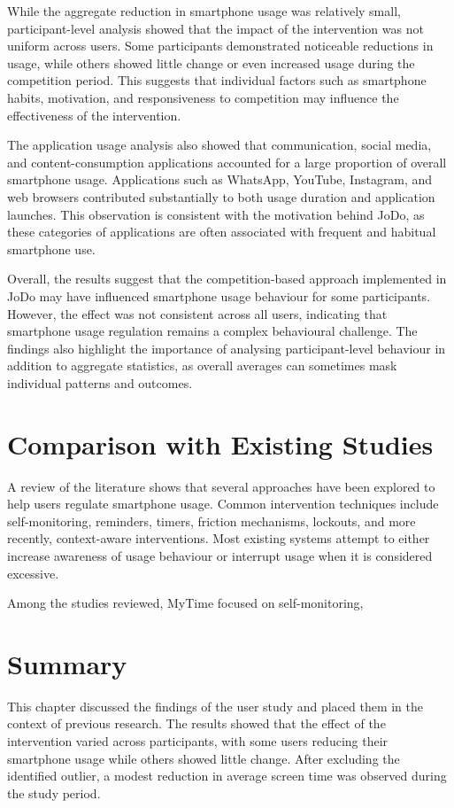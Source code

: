 \documentclass[11pt]{report}
\begin{document}
While the aggregate reduction in smartphone usage was relatively small, participant-level 
analysis showed that the impact of the intervention was not uniform across users. 
Some participants demonstrated noticeable reductions in usage, while others showed 
little change or even increased usage during the competition period. This suggests that 
individual factors such as smartphone habits, motivation, and responsiveness to 
competition may influence the effectiveness of the intervention.

The application usage analysis also showed that communication, social media, and 
content-consumption applications accounted for a large proportion of overall smartphone 
usage. Applications such as WhatsApp, YouTube, Instagram, and web browsers contributed 
substantially to both usage duration and application launches. This observation is 
consistent with the motivation behind JoDo, as these categories of applications are 
often associated with frequent and habitual smartphone use.

Overall, the results suggest that the competition-based approach implemented in JoDo 
may have influenced smartphone usage behaviour for some participants. However, the 
effect was not consistent across all users, indicating that smartphone usage regulation 
remains a complex behavioural challenge. The findings also highlight the importance of 
analysing participant-level behaviour in addition to aggregate statistics, as overall 
averages can sometimes mask individual patterns and outcomes.

\section{Comparison with Existing Studies}

A review of the literature shows that several approaches have been explored to help 
users regulate smartphone usage. Common intervention techniques include self-monitoring, 
reminders, timers, friction mechanisms, lockouts, and more recently, 
context-aware interventions. Most existing systems attempt to either increase 
awareness of usage behaviour or interrupt usage when it is considered excessive.

Among the studies reviewed, MyTime focused on self-monitoring, \section{Summary}

This chapter discussed the findings of the user study and placed them in the context of previous research. The results showed that the effect of the intervention varied across participants, with some users reducing their smartphone usage while others showed little change. After excluding the identified outlier, a modest reduction in average screen time was observed during the study period.
\end{document}
